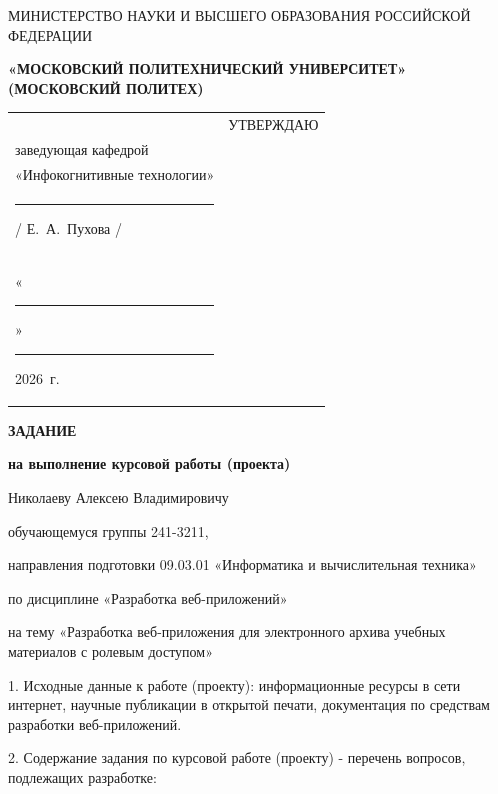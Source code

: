 \documentclass[14pt, a4paper]{extarticle}
\begin{document}
\pagestyle{empty}

\begin{center}
    {\small МИНИСТЕРСТВО НАУКИ И ВЫСШЕГО ОБРАЗОВАНИЯ РОССИЙСКОЙ ФЕДЕРАЦИИ}


    {\small \textbf{«МОСКОВСКИЙ ПОЛИТЕХНИЧЕСКИЙ УНИВЕРСИТЕТ»}} \\
    {\small \textbf{(МОСКОВСКИЙ ПОЛИТЕХ)}}
\end{center}

\begin{tabularx}{\textwidth}{@{} p{} p{} @{} }
     &
    \raggedright
    УТВЕРЖДАЮ                          \\
    заведующая кафедрой                \\
    «Инфокогнитивные технологии»       \\[0.3cm]

    \rule{3cm}{0.4pt} / Е.~А.~Пухова / \\[0.1cm]

    «\rule{0.8cm}{0.4pt}» \rule{3cm}{0.4pt} 2026~г.
\end{tabularx}

\begin{center}
    {\large \textbf{ЗАДАНИЕ}}

    \textbf{на выполнение курсовой работы (проекта)}

    Николаеву Алексею Владимировичу
\end{center}

обучающемуся группы 241-3211,

направления подготовки 09.03.01 «Информатика и вычислительная техника»

по дисциплине «Разработка веб-приложений»

на тему «Разработка веб-приложения для электронного архива учебных материалов с ролевым доступом»

1. Исходные данные к работе (проекту): информационные ресурсы в сети интернет, научные публикации в открытой печати, документация по средствам разработки веб-приложений.

2. Содержание задания по курсовой работе (проекту) - перечень вопросов, подлежащих разработке:
\end{document}
